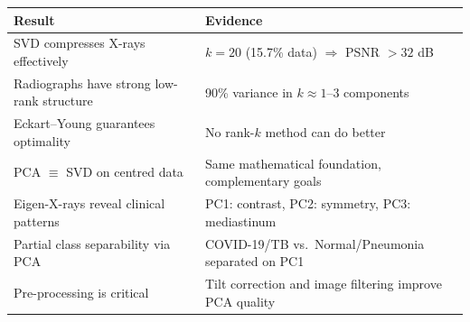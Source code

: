 \documentclass[11pt,a4paper]{article}
\theoremstyle{definition}
\begin{document}
\begin{table}[H]
\centering
\begin{tabularx}{\linewidth}{lX}
\toprule
\textbf{Result} & \textbf{Evidence} \\
\midrule
SVD compresses X-rays effectively & $k=20$ (15.7\% data) $\Rightarrow$ PSNR $>32$ dB \\
Radiographs have strong low-rank structure & 90\% variance in $k\approx 1$--3 components \\
Eckart--Young guarantees optimality & No rank-$k$ method can do better \\
PCA $\equiv$ SVD on centred data & Same mathematical foundation, complementary goals \\
Eigen-X-rays reveal clinical patterns & PC1: contrast, PC2: symmetry, PC3: mediastinum \\
Partial class separability via PCA & COVID-19/TB vs.\ Normal/Pneumonia separated on PC1 \\
Pre-processing is critical & Tilt correction and image filtering improve PCA quality \\
\bottomrule
\end{tabularx}
\end{table}

\end{document}

